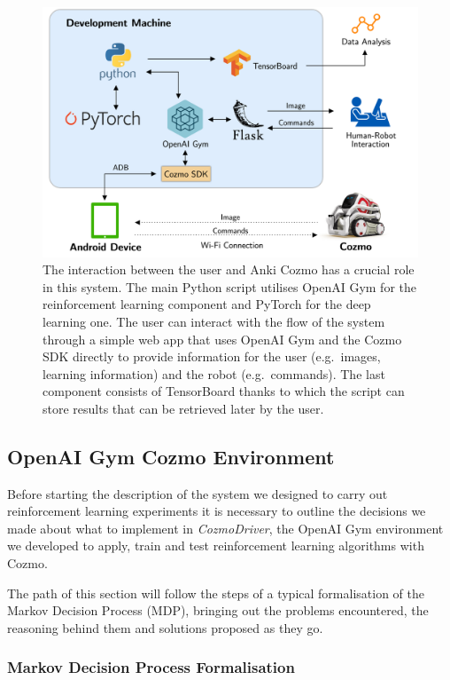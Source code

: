 \begin{figure}
    \centering
    \includegraphics[width=\textwidth]{img/cozmo-system.png}
    \caption[Outline of the control system]{The interaction between the user and Anki Cozmo has a crucial role in this system.
        The main Python script utilises OpenAI Gym for the reinforcement learning component and PyTorch for the deep learning one.
        The user can interact with the flow of the system through a simple web app that uses OpenAI Gym and the Cozmo SDK directly to provide information for the user (e.g.\ images, learning information) and the robot (e.g.\ commands).
        The last component consists of TensorBoard thanks to which the script can store results that can be retrieved later by the user.}
    \label{fig:system}
\end{figure}

\subsection{OpenAI Gym Cozmo Environment}

Before starting the description of the system we designed to carry out reinforcement learning experiments it is necessary to outline the decisions we made about what to implement in \textit{CozmoDriver}, the OpenAI Gym environment we developed to apply, train and test reinforcement learning algorithms with Cozmo.

The path of this section will follow the steps of a typical formalisation of the Markov Decision Process (MDP), bringing out the problems encountered, the reasoning behind them and solutions proposed as they go.

\subsubsection{Markov Decision Process Formalisation} \label{subsubsec:mdp_form}

